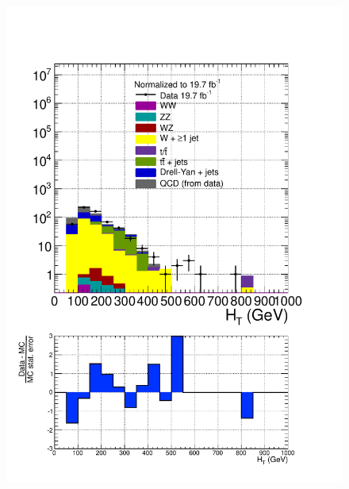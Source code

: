 \begin{figure}[hbtp]
  \begin{center}
    \includegraphics[width=\cmsFigWidth]{figures/dataVsMCQCD_HT_lowMT_v87}

\end{center}
\end{figure}
